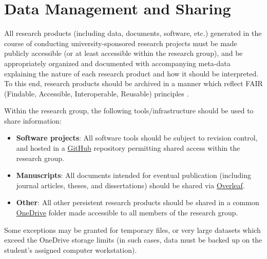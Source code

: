 \documentclass[12pt,a4paper,article,oneside]{memoir} %
\begin{document}

\section{Data Management and Sharing}


All research products (including data, documents, software, etc.) generated in the course of conducting university-sponsored research projects must be made publicly accessible (or at least accessible within the research group), and be appropriately organized and documented with accompanying meta-data explaining the nature of each research product and how it should be interpreted. To this end, research products should be archived in a manner which reflect FAIR (Findable, Accessible, Interoperable, Reusable) principles \citep{wilkinson_2016}.

Within the research group, the following tools/infrastructure should be used to share information:
\begin{itemize}
\item \textbf{Software projects}: All software tools should be subject to revision control, and hosted in a \href{https://github.com}{GitHub} repository permitting shared access within the research group.
\item \textbf{Manuscripts}: All documents intended for eventual publication (including journal articles, theses, and dissertations) should be shared via \href{https://www.overleaf.com/edu/okstate}{Overleaf}.
\item \textbf{Other}: All other persistent research products should be shared in a common \href{https://it.okstate.edu/services/online-file-storage-students/}{OneDrive} folder made accessible to all members of the research group.
\end{itemize}
Some exceptions may be granted for temporary files, or very large datasets which exceed the OneDrive storage limits (in such cases, data must be backed up on the student's assigned computer workstation).

\end{document}
